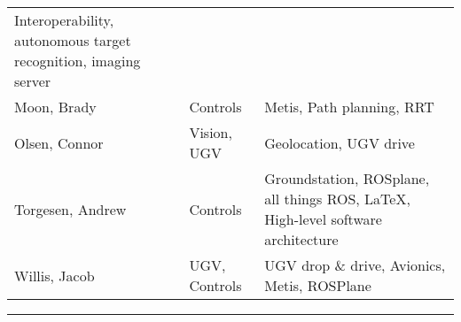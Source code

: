\documentclass[]{auvsi_doc}
\begin{document}
\begin{longtable}[]{@{}lll@{}}
\begin{minipage}[t]{0.30\columnwidth}
{Interoperability, autonomous target recognition, imaging server}\strut
\end{minipage}\tabularnewline
\begin{minipage}[t]{0.30\columnwidth}\raggedright\strut
{Moon, Brady}\strut
\end{minipage} & \begin{minipage}[t]{0.30\columnwidth}\raggedright\strut
{Controls}\strut
\end{minipage} & \begin{minipage}[t]{0.30\columnwidth}\raggedright\strut
{Metis, Path planning, RRT}\strut
\end{minipage}\tabularnewline
\begin{minipage}[t]{0.30\columnwidth}\raggedright\strut
{Olsen, Connor}\strut
\end{minipage} & \begin{minipage}[t]{0.30\columnwidth}\raggedright\strut
{Vision, UGV}\strut
\end{minipage} & \begin{minipage}[t]{0.30\columnwidth}\raggedright\strut
{Geolocation, UGV drive}\strut
\end{minipage}\tabularnewline
\begin{minipage}[t]{0.30\columnwidth}\raggedright\strut
{Torgesen, Andrew}\strut
\end{minipage} & \begin{minipage}[t]{0.30\columnwidth}\raggedright\strut
{Controls}\strut
\end{minipage} & \begin{minipage}[t]{0.30\columnwidth}\raggedright\strut
{Groundstation, ROSplane, all things ROS, LaTeX, High-level software
architecture}\strut
\end{minipage}\tabularnewline
\begin{minipage}[t]{0.30\columnwidth}\raggedright\strut
{Willis, Jacob}\strut
\end{minipage} & \begin{minipage}[t]{0.30\columnwidth}\raggedright\strut
{UGV, Controls}\strut
\end{minipage} & \begin{minipage}[t]{0.30\columnwidth}\raggedright\strut
{UGV drop \& drive, Avionics, Metis, ROSPlane}\strut
\end{minipage}\tabularnewline
\bottomrule
\end{longtable}

{}

\begin{center}\rule{0.5\linewidth}{\linethickness}\end{center}
\end{document}

